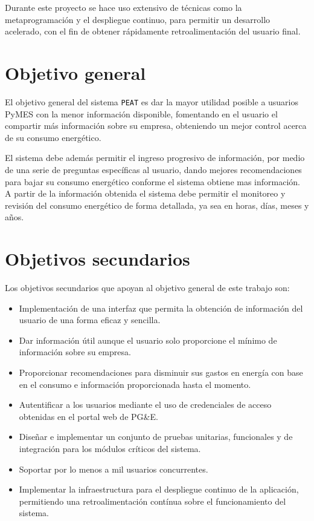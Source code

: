 Durante este proyecto se hace uso extensivo de técnicas como la metaprogramación
y el despliegue continuo, para permitir un desarrollo acelerado, con el fin de
obtener rápidamente retroalimentación del usuario final.

\section*{Objetivo general}

El objetivo general del sistema \texttt{PEAT} es dar la mayor utilidad posible
a usuarios PyMES con la menor información disponible, fomentando en el usuario
el compartir más información sobre su empresa, obteniendo un mejor control
acerca de su consumo energético.

El sistema debe además permitir el ingreso progresivo de información, por medio
de una serie de preguntas específicas al usuario, dando mejores recomendaciones
para bajar su consumo energético conforme el sistema obtiene mas información.
A partir de la información obtenida el sistema debe permitir el monitoreo
y revisión del consumo energético de forma detallada, ya sea en horas,
días, meses y años.

\section*{Objetivos secundarios}

Los objetivos secundarios que apoyan al objetivo general de este trabajo son:
\begin{itemize}
\item Implementación de una interfaz que permita la obtención
  de información del usuario de una forma eficaz y sencilla.
\item Dar información útil aunque el usuario solo proporcione el
  mínimo de información sobre su empresa.
\item Proporcionar recomendaciones para disminuir sus
  gastos en energía con base en el consumo e información proporcionada
  hasta el momento.
\item Autentificar a los usuarios mediante el uso de credenciales de acceso
  obtenidas en el portal web de PG\&E.
\item Diseñar e implementar un conjunto de pruebas unitarias, funcionales
  y de integración para los módulos críticos del sistema.
\item Soportar por lo menos a mil usuarios concurrentes.
\item Implementar la infraestructura para el despliegue continuo de la
  aplicación, permitiendo una retroalimentación contínua sobre el
  funcionamiento del sistema.
\end{itemize}

